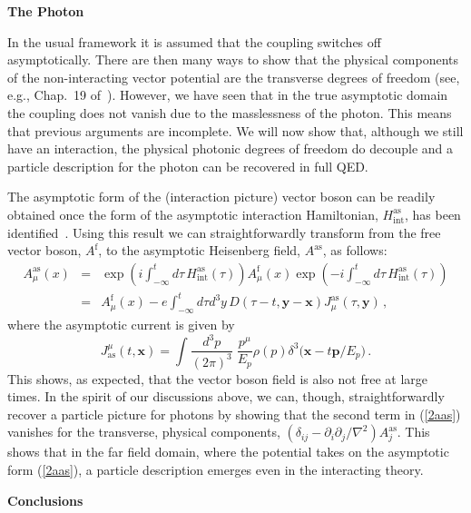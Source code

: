 \documentclass[12pt,a4paper]{article}
\newcommand{\no}{\noindent}
\newcommand{\free}{{\mathrm{f}}}
\newcommand{\Afree}{A^\free}
\newcommand{\as}{{\mathrm{as}}}
\newcommand{\Haas}{{ H}_{\mathrm{int}}^{\mathrm \as}}
\newcommand{\Aas}{A^\as}
\newcommand{\xb}{{\boldsymbol x}}
\newcommand{\yb}{{\boldsymbol y}}
\newcommand{\pb}{{\boldsymbol p}}
\newcommand{\intp}{\int\!\frac{d^3p}{(2\pi)^3}\;}
\begin{document}
\bigskip

\noindent \no \textbf{The Photon}

\smallskip

\no In the usual framework  it is assumed that the coupling
switches off asymptotically.
There are then many ways to show that the physical components of
the non-interacting vector potential are the transverse degrees of freedom (see, e.g.,
Chap.~19 of~\cite{Henneaux:1992ig}).
However, we have seen that
in
the true asymptotic domain the coupling does not vanish due to the masslessness of the
photon. This means that previous arguments are incomplete. We will
now show that, although we still have an interaction, the
physical photonic degrees of freedom do decouple and a particle
description for the photon can be recovered in full QED.

The asymptotic form of the (interaction picture) vector boson
can be readily obtained once the form of the asymptotic interaction Hamiltonian, $\Haas$, has been
identified~\cite{kulish:1970,Horan:1999ba}. Using this result we can
straightforwardly transform from the free vector boson, $\Afree$, to
the asymptotic Heisenberg field, $\Aas$,  as follows:
{\setlength\arraycolsep{2pt}
\begin{eqnarray}\label{2aas}
 \Aas_\mu(x)&=&\exp\!\!\left(i\!\!\int_{-\infty}^t\!\!\!\!\!\!
 d\tau\,\Haas(\tau)\right)\Afree_\mu(x)
 \exp\!\!\left(-i\!\!\int_{-\infty}^t\!\!\!\!\!\!d\tau\,
 \Haas(\tau)\right)\nonumber\\
&=&\Afree_\mu(x)-e\int_{-\infty}^t\!\!d\tau d^3y\,D(\tau-t,
\yb-\xb)J^\as_\mu(\tau,\yb)\,,
\end{eqnarray}}%
where the asymptotic current is given by
\begin{equation}\label{2jas}
  J^\mu_{\as}(t,\xb)=\intp\frac{p^\mu}{E_p}\rho(p)\delta^3
  \bigl(\xb-t\pb/E_p\bigr)\,.
\end{equation}
This shows, as expected, that the vector boson field is also not free at large times.
In the spirit of our discussions above, we can, though, straightforwardly recover a
particle picture for photons by showing that the second term in (\ref{2aas})
vanishes for the transverse,  physical components,
$(\delta_{ij}-\partial_{i}\partial_{j}/\nabla^2)\Aas_{j}$. This shows
that in the far field domain, where the potential takes on the
asymptotic form (\ref{2aas}), a particle description emerges even in the interacting
theory.

\bigskip

\noindent \no \textbf{Conclusions}
\end{document}
